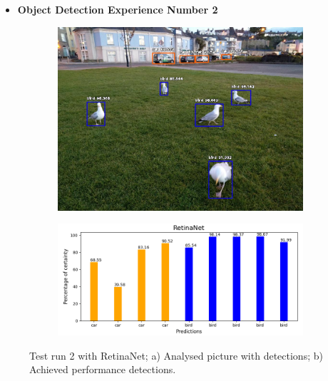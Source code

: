       \newpage

      
  \begin{itemize}
    \item \textbf{Object Detection Experience Number 2}
  \end{itemize}

    

      \begin{figure}[H]
        \centering
        \captionsetup{justification=centering}

        \begin{subfigure}{0.29\textwidth}
        \includegraphics[width=\textwidth]{Sections/4InitialWork/4_images_obj_run3/retinaNet.jpg} 
        \caption{}
        \end{subfigure}
        \begin{subfigure}{0.65\textwidth}
        \includegraphics[width=\textwidth]{Sections/4InitialWork/4_images_obj_run3/retinaNet_graph.png}
        \caption{}
        \end{subfigure}
        
        \caption[Test run 2 with RetinaNet]{ 
        Test run 2 with RetinaNet; a) Analysed picture with detections; b) Achieved performance detections. }
        \label{fig:retina_2}
        \end{figure}



